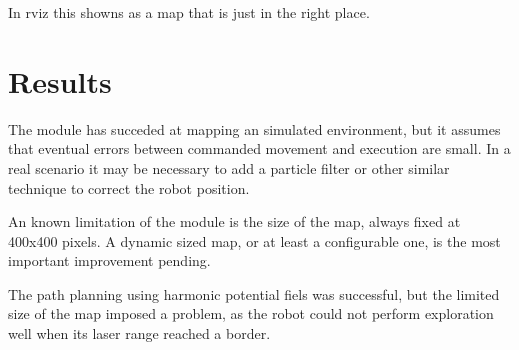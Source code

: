 \documentclass[a4paper,twocolumn]{article}
\begin{document}
    In rviz this showns as a map that is just in the right place.

\section{Results}
    The module has succeded at mapping an simulated environment, but it assumes that eventual errors between commanded movement and execution are small. In a real scenario it may be necessary to add a particle filter or other similar technique to correct the robot position.

    An known limitation of the module is the size of the map, always fixed at 400x400 pixels. A dynamic sized map, or at least a configurable one, is the most important improvement pending.
    
    The path planning using harmonic potential fiels was successful, but the limited size of the map imposed a problem, as the robot could not perform exploration well when its laser range reached a border.



\end{document}
